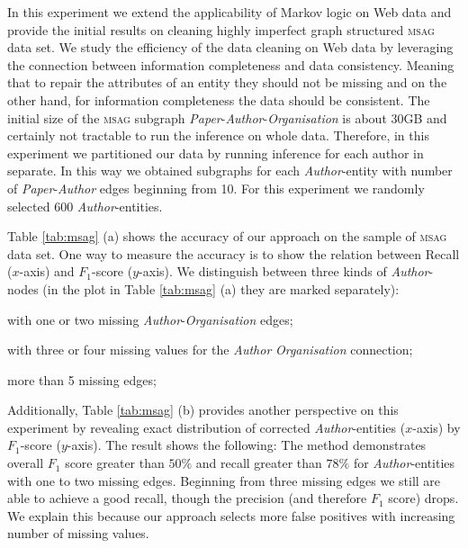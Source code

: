 In this experiment we extend the applicability of Markov logic on Web data and provide the initial results on cleaning highly imperfect graph structured \textsc{msag} data set. We study the efficiency of the data cleaning on Web data by leveraging the connection between information completeness and data consistency. Meaning that to repair the attributes of an entity they should not be missing and on the other hand, for information completeness the data should be consistent. The initial size of the \textsc{msag} subgraph \textit{Paper}-\textit{Author}-\textit{Organisation} is about 30GB and certainly not tractable to run the inference on whole data. Therefore, in this experiment we partitioned our data by running inference for each author in separate. In this way we obtained subgraphs for each \textit{Author}-entity with number of \textit{Paper}-\textit{Author} edges beginning from 10. For this experiment we randomly selected 600 \textit{Author}-entities. 

Table \ref{tab:msag} (a) shows the accuracy of our approach on the sample of \textsc{msag} data set. One way to measure the accuracy is to show the relation between Recall ($x$-axis) and $F_1$-score ($y$-axis). We distinguish between three kinds of \textit{Author}-nodes (in the plot in Table \ref{tab:msag} (a) they are marked separately): 
\begin{enumerate*}[label=\itshape\arabic*\upshape)]
\item with one or two missing \textit{Author}-\textit{Organisation} edges;
\item with three or four missing values for the \textit{Author} \textit{Organisation} connection;
\item more than 5 missing edges;
\end{enumerate*}
Additionally, Table \ref{tab:msag} (b) provides another perspective on this experiment by revealing exact distribution of corrected \textit{Author}-entities ($x$-axis) by $F_1$-score ($y$-axis). The result shows the following: The method demonstrates overall $F_1$ score greater than $50\%$ and recall greater than $78\%$ for \textit{Author}-entities with one to two missing edges. Beginning from three missing edges we still are able to achieve a good recall, though the precision (and therefore $F_1$ score) drops. We explain this because our approach selects more false positives with increasing number of missing values. 

